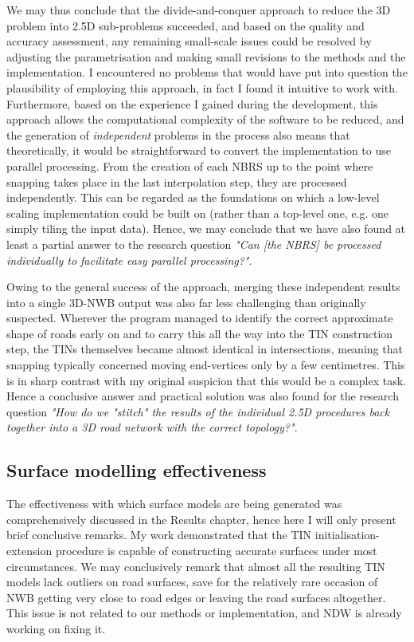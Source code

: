 We may thus conclude that the divide-and-conquer approach to reduce the 3D problem into 2.5D sub-problems succeeded, and based on the quality and accuracy assessment, any remaining small-scale issues could be resolved by adjusting the parametrisation and making small revisions to the methods and the implementation. I encountered no problems that would have put into question the plausibility of employing this approach, in fact I found it intuitive to work with. Furthermore, based on the experience I gained during the development, this approach allows the computational complexity of the software to be reduced, and the generation of \textit{independent} problems in the process also means that theoretically, it would be straightforward to convert the implementation to use parallel processing. From the creation of each NBRS up to the point where snapping takes place in the last interpolation step, they are processed independently. This can be regarded as the foundations on which a low-level scaling implementation could be built on (rather than a top-level one, e.g. one simply tiling the input data). Hence, we may conclude that we have also found at least a partial answer to the research question \textit{"Can [the NBRS] be processed individually to facilitate easy parallel processing?"}.

Owing to the general success of the approach, merging these independent results into a single 3D-NWB output was also far less challenging than originally suspected. Wherever the program managed to identify the correct approximate shape of roads early on and to carry this all the way into the TIN construction step, the TINs themselves became almost identical in intersections, meaning that snapping typically concerned moving end-vertices only by a few centimetres. This is in sharp contrast with my original suspicion that this would be a complex task. Hence a conclusive answer and practical solution was also found for the research question \textit{"How do we "stitch" the results of the individual 2.5D procedures back together into a 3D road network with the correct topology?"}.

\subsection{Surface modelling effectiveness}
\label{sub:effectivenessmodelling}

The effectiveness with which surface models are being generated was comprehensively discussed in the Results chapter, hence here I will only present brief conclusive remarks. My work demonstrated that the TIN initialisation-extension procedure is capable of constructing accurate surfaces under most circumstances. We may conclusively remark that almost all the resulting TIN models lack outliers on road surfaces, save for the relatively rare occasion of NWB getting very close to road edges or leaving the road surfaces altogether. This issue is not related to our methods or implementation, and NDW is already working on fixing it.

